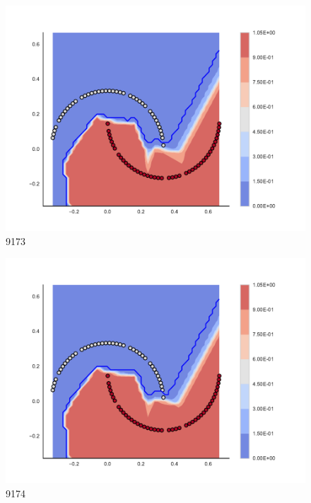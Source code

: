 \begin{subfigure}[b]{0.09\textwidth}
    \includegraphics[clip, trim=2.35cm 1.75cm 4.5cm 0cm,width=\textwidth]{img/convergence/9173.pdf}
    \caption{9173}
    \label{fig:convergence_9173}
\end{subfigure}
%
\begin{subfigure}[b]{0.09\textwidth}
    \includegraphics[clip, trim=2.35cm 1.75cm 4.5cm 0cm,width=\textwidth]{img/convergence/9174.pdf}
    \caption{9174}
    \label{fig:convergence_9174}
\end{subfigure}
%

